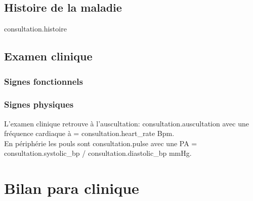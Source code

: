 \documentclass[headlines=6,headinclude=true,11pt]{scrartcl}
\begin{document}
                  \subsection*{Histoire de la maladie}
                  {{ consultation.histoire }}
                  


                  \subsection*{Examen clinique}
                  \subsubsection*{Signes fonctionnels}
                  \begin{itemize}
                    {%
                      {%
                        {%
     {%

\end{itemize}
\subsubsection*{Signes physiques}
 L'examen clinique retrouve à l'auscultation: {{ consultation.auscultation }} avec
 une fréquence cardiaque à = {{ consultation.heart_rate}} Bpm.\\

 En périphérie les pouls sont {{ consultation.pulse }} avec une PA = {{ consultation.systolic_bp }}/{{ consultation.diastolic_bp }}mmHg.\\

\section*{Bilan para clinique}
\end{document}
